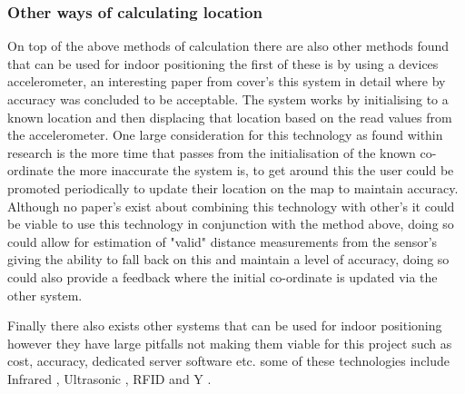 \subsubsection{Other ways of calculating location}
On top of the above methods of calculation there are also other methods found that can be used for indoor positioning the first of these is by using a devices accelerometer, an interesting paper from \citetemp cover's this system in detail where by accuracy was concluded to be acceptable. The system works by initialising to a known location and then displacing that location based on the read values from the accelerometer. One large consideration for this technology as found within \citetemp research is the more time that passes from the initialisation of the known co-ordinate the more inaccurate the system is, to get around this the user could be promoted periodically to update their location on the map to maintain accuracy. Although no paper's exist about combining this technology with other's it could be viable to use this technology in conjunction with the method above, doing so could allow for estimation of "valid" distance measurements from the sensor's giving the ability to fall back on this and maintain a level of accuracy, doing so could also provide a feedback where the initial co-ordinate is updated via the other system.

Finally there also exists other systems that can be used for indoor positioning however they have large pitfalls not making them viable for this project such as cost, accuracy, dedicated server software etc. some of these technologies include Infrared \citetemp, Ultrasonic \citetemp, RFID \citetemp and Y \citetemp. 
